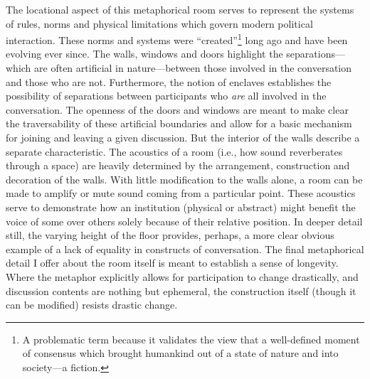 \documentclass{article}
\begin{document}
The locational aspect of this metaphorical room serves to represent the systems of rules, norms and physical limitations which govern modern political interaction.
These norms and systems were ``created''\footnote{A problematic term because it validates the view that a well-defined moment of consensus which brought humankind out of a state of nature and into society---a fiction.} long ago and have been evolving ever since.
The walls, windows and doors highlight the separations---which are often artificial in nature---between those involved in the conversation and those who are not.
Furthermore, the notion of enclaves establishes the possibility of separations between participants who \emph{are} all involved in the conversation.
The openness of the doors and windows are meant to make clear the traversability of these artificial boundaries and allow for a basic mechanism for joining and leaving a given discussion.
But the interior of the walls describe a separate characteristic.
The acoustics of a room (i.e., how sound reverberates through a space) are heavily determined by the arrangement, construction and decoration of the walls.
With little modification to the walls alone, a room can be made to amplify or mute sound coming from a particular point.
These acoustics serve to demonstrate how an institution (physical or abstract) might benefit the voice of some over others solely because of their relative position.
In deeper detail still, the varying height of the floor provides, perhaps, a more clear obvious example of a lack of equality in constructs of conversation.
The final metaphorical detail I offer about the room itself is meant to establish a sense of longevity.
Where the metaphor explicitly allows for participation to change drastically, and discussion contents are nothing but ephemeral, the construction itself (though it can be modified) resists drastic change.
\end{document}
